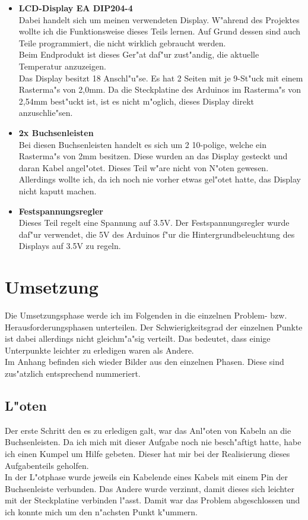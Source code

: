 \documentclass[a4paper]{scrreprt}
\begin{document}
\begin{itemize}
			\item \textbf{LCD-Display EA DIP204-4} \\
			Dabei handelt sich um meinen verwendeten Display. W"ahrend des Projektes wollte ich
			die Funktionsweise dieses Teils lernen. Auf Grund dessen sind auch Teile programmiert, 
			die nicht wirklich gebraucht werden. \\
			Beim Endprodukt ist dieses Ger"at daf"ur zust"andig, die aktuelle Temperatur 
			anzuzeigen. \\
			Das Display besitzt 18 Anschl"u"se. Es hat 2 Seiten mit je 9-St"uck mit einem Rasterma"s
			von 2,0mm. Da die Steckplatine des Arduinos im Rasterma"s von 2,54mm best"uckt ist, 
			ist es nicht m"oglich, dieses Display direkt anzuschlie"sen.
			\newpage
			\item \textbf{2x Buchsenleisten} \\
			Bei diesen Buchsenleisten handelt es sich um 2 10-polige, welche ein Rasterma"s von 2mm
			besitzen. Diese wurden an das Display gesteckt und daran Kabel angel"otet.
			Dieses Teil w"are nicht von N"oten gewesen. Allerdings wollte ich, da ich noch nie
			vorher etwas gel"otet hatte, das Display nicht kaputt machen.
			
			\item \textbf{Festspannungsregler} \\
			Dieses Teil regelt eine Spannung auf 3.5V.
			Der Festspannungsregler wurde daf"ur verwendet, die 5V des Arduinos f"ur die 
			Hintergrundbeleuchtung des Displays auf 3.5V zu regeln. 			 
		\end{itemize}
		
	\chapter{Umsetzung}
		Die Umsetzungsphase werde ich im Folgenden in die einzelnen Problem- bzw.
		Herausforderungsphasen unterteilen. Der Schwierigkeitsgrad der einzelnen Punkte 
		ist dabei allerdings nicht gleichm"a"sig verteilt. Das bedeutet, dass einige
		Unterpunkte leichter zu erledigen waren als Andere. \\
		Im Anhang befinden sich wieder Bilder aus den einzelnen Phasen. 
		Diese sind zus"atzlich entsprechend nummeriert.
		
		\section{L"oten}
			Der erste Schritt den es zu erledigen galt, war das Anl"oten von Kabeln an
			die Buchsenleisten. Da ich mich mit dieser Aufgabe noch nie besch"aftigt hatte,
			habe ich einen Kumpel um Hilfe gebeten.
			Dieser hat mir bei der Realisierung dieses Aufgabenteils geholfen. \\
			In der L"otphase wurde jeweils ein Kabelende eines Kabels mit einem Pin 
			der Buchsenleiste verbunden. Das Andere wurde verzinnt,	damit dieses sich 
			leichter mit der Steckplatine verbinden l"asst.
			Damit war das Problem abgeschlossen und ich konnte mich um den 
			n"achsten Punkt k"ummern.
		
\end{document}
